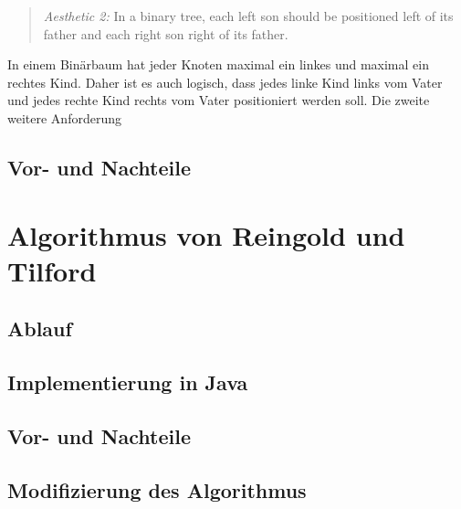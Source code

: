 \begin{quotation}
	\textit{Aesthetic 2:} In a binary tree, each left son should be positioned
	left of its father and each right son right of its father.\cite[]{q1}
\end{quotation}

In einem Binärbaum hat jeder Knoten maximal ein linkes und maximal ein rechtes Kind. Daher ist es auch logisch, dass jedes linke Kind 
links vom Vater und jedes rechte Kind rechts vom Vater positioniert werden soll. Die zweite weitere Anforderung 

\subsection{Vor- und Nachteile}

\section{Algorithmus von Reingold und Tilford}

\subsection{Ablauf}

\subsection{Implementierung in Java}

\subsection{Vor- und Nachteile}

\subsection{Modifizierung des Algorithmus}
